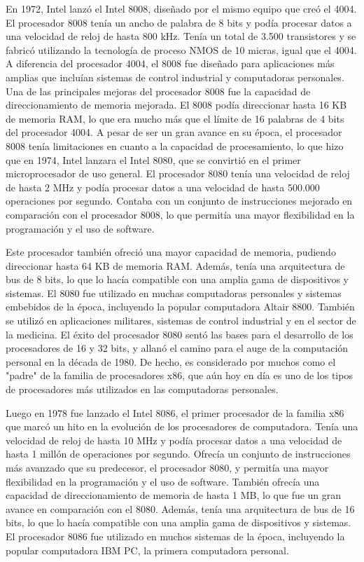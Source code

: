 \documentclass{article}
\begin{document}
En 1972, Intel lanzó el Intel 8008, diseñado por el mismo equipo que creó el 4004. El procesador 8008 tenía un ancho de palabra de 8 bits 
y podía procesar datos a una velocidad de reloj de hasta 800 kHz. Tenía un total de 3.500 transistores y se fabricó utilizando 
la tecnología de proceso NMOS de 10 micras, igual que el 4004. A diferencia del procesador 4004, el 8008 fue diseñado para aplicaciones 
más amplias que incluían sistemas de control industrial y computadoras personales.
Una de las principales mejoras del procesador 8008 fue la capacidad de direccionamiento de memoria mejorada. El 8008 podía direccionar 
hasta 16 KB de memoria RAM, lo que era mucho más que el límite de 16 palabras de 4 bits del procesador 4004.
A pesar de ser un gran avance en su época, el procesador 8008 tenía limitaciones en cuanto a la capacidad de procesamiento, 
lo que hizo que en 1974, Intel lanzara el Intel 8080, que se convirtió en el primer microprocesador de uso general. 
El procesador 8080 tenía una velocidad de reloj de hasta 2 MHz y podía procesar datos a una velocidad de hasta 500.000 
operaciones por segundo. Contaba con un conjunto de instrucciones mejorado en comparación con el procesador 8008, lo que permitía 
una mayor flexibilidad en la programación y el uso de software.\cite{Wilson2010}

Este procesador también ofreció una mayor capacidad de memoria, pudiendo direccionar hasta 64 KB de memoria RAM. Además, 
tenía una arquitectura de bus de 8 bits, lo que lo hacía compatible con una amplia gama de dispositivos y sistemas.
El 8080 fue utilizado en muchas computadoras personales y sistemas embebidos de la época, incluyendo la popular computadora Altair 8800. 
También se utilizó en aplicaciones militares, sistemas de control industrial y en el sector de la medicina. El éxito del procesador 8080 
sentó las bases para el desarrollo de los procesadores de 16 y 32 bits, y allanó el camino para el auge de la computación personal en la década de 1980. 
De hecho, es considerado por muchos como el "padre" de la familia de procesadores x86, que aún hoy en día es uno de los tipos de procesadores 
más utilizados en las computadoras personales.

Luego en 1978 fue lanzado el Intel 8086, el primer procesador de la familia x86 que marcó un hito en la evolución de los procesadores de computadora. 
Tenía una velocidad de reloj de hasta 10 MHz y podía procesar datos a una velocidad de hasta 1 millón de operaciones por segundo. 
Ofrecía un conjunto de instrucciones más avanzado que su predecesor, el procesador 8080, y permitía una mayor flexibilidad en la programación y 
el uso de software. También ofrecía una capacidad de direccionamiento de memoria de hasta 1 MB, lo que fue un gran avance en comparación con el 8080. 
Además, tenía una arquitectura de bus de 16 bits, lo que lo hacía compatible con una amplia gama de dispositivos y sistemas.
El procesador 8086 fue utilizado en muchos sistemas de la época, incluyendo la popular computadora IBM PC, la primera computadora personal.
\end{document}
